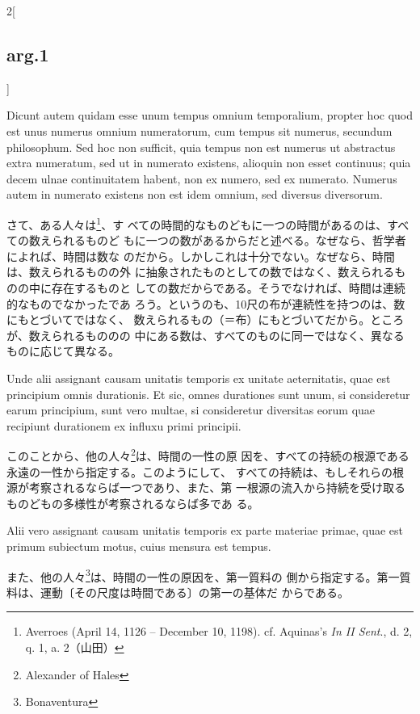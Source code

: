 \documentclass[paper=a4paper,fontsize=10pt,jafontsize=9pt,titlepage]{jlreq}
\begin{document}
\begin{paracol}{2}[\subsection{arg.1}]
\switchcolumn*

Dicunt autem quidam esse unum tempus omnium temporalium, propter hoc
quod est unus numerus omnium numeratorum, cum tempus sit numerus,
secundum philosophum.  Sed hoc non sufficit, quia tempus non est
numerus ut abstractus extra numeratum, sed ut in numerato existens,
alioquin non esset continuus; quia decem ulnae continuitatem habent,
non ex numero, sed ex numerato. Numerus autem in numerato existens non
est idem omnium, sed diversus diversorum.

\switchcolumn

さて、ある人々は\footnote{Averroes (April 14, 1126 -- December 10,
1198). cf. Aquinas's {\itshape In II Sent}., d. 2, q. 1, a. 2（山田）}、す
べての時間的なものどもに一つの時間があるのは、すべての数えられるものど
もに一つの数があるからだと述べる。なぜなら、哲学者によれば、時間は数な
のだから。しかしこれは十分でない。なぜなら、時間は、数えられるものの外
に抽象されたものとしての数ではなく、数えられるものの中に存在するものと
しての数だからである。そうでなければ、時間は連続的なものでなかったであ
ろう。というのも、10尺の布が連続性を持つのは、数にもとづいてではなく、
数えられるもの（＝布）にもとづいてだから。ところが、数えられるもののの
中にある数は、すべてのものに同一ではなく、異なるものに応じて異なる。

\switchcolumn*

Unde alii assignant causam unitatis temporis ex unitate
aeternitatis, quae est principium omnis durationis. Et sic, omnes
durationes sunt unum, si consideretur earum principium, sunt vero
multae, si consideretur diversitas eorum quae recipiunt durationem ex
influxu primi principii.

\switchcolumn

このことから、他の人々\footnote{Alexander of Hales}は、時間の一性の原
因を、すべての持続の根源である永遠の一性から指定する。このようにして、
すべての持続は、もしそれらの根源が考察されるならば一つであり、また、第
一根源の流入から持続を受け取るものどもの多様性が考察されるならば多であ
る。

\switchcolumn*

Alii vero assignant causam unitatis temporis ex
parte materiae primae, quae est primum subiectum motus, cuius mensura
est tempus.

\switchcolumn

また、他の人々\footnote{Bonaventura}は、時間の一性の原因を、第一質料の
側から指定する。第一質料は、運動〔その尺度は時間である〕の第一の基体だ
からである。

\switchcolumn*


\end{paracol}
\end{document}
